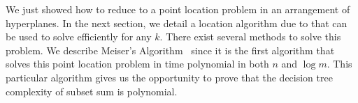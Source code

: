 We just showed how to reduce \kSUM to a
point location problem in an arrangement of hyperplanes. In the next section,
we detail a location algorithm due to \citet*{meiser:1993} that can be used to
solve \kSUM efficiently for any $k$. There exist several methods to solve
this problem. We describe Meiser's Algorithm~\cite{meiser:1993} since it
is the first algorithm that solves this point location problem in time
polynomial in both $n$ and $\log m$. This particular
algorithm gives us the opportunity to prove that the decision tree complexity
of subset sum is polynomial.


